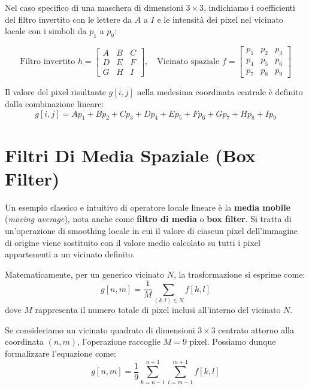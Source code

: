 ﻿\documentclass[11pt, a4paper]{article}
\begin{document}
Nel caso specifico di una maschera di dimensioni $3\times3$, indichiamo i coefficienti del filtro invertito con le lettere da $A$ a $I$ e le intensità dei pixel nel vicinato locale con i simboli da $p_1$ a $p_9$:

\[
\text{Filtro invertito } h = \begin{bmatrix} A & B & C \\ D & E & F \\ G & H & I \end{bmatrix}, \quad \text{Vicinato spaziale } f = \begin{bmatrix} p_1 & p_2 & p_3 \\ p_4 & p_5 & p_6 \\ p_7 & p_8 & p_9 \end{bmatrix}
\]

Il valore del pixel risultante $g[i, j]$ nella medesima coordinata centrale è definito dalla combinazione lineare:
\[ \boxed{g[i, j] = A p_1 + B p_2 + C p_3 + D p_4 + E p_5 + F p_6 + G p_7 + H p_8 + I p_9} \]


\newpage

\section{Filtri Di Media Spaziale (Box Filter)}

Un esempio classico e intuitivo di operatore locale lineare è la \textbf{media mobile} (\emph{moving average}), nota anche come \textbf{filtro di media} o \textbf{box filter}. Si tratta di un'operazione di smoothing locale in cui il valore di ciascun pixel dell'immagine di origine viene sostituito con il valore medio calcolato su tutti i pixel appartenenti a un vicinato definito.

Matematicamente, per un generico vicinato $N$, la trasformazione si esprime come:
\[ g[n, m] = \frac{1}{M} \sum_{(k, l) \in N} f[k, l] \]
dove $M$ rappresenta il numero totale di pixel inclusi all'interno del vicinato $N$.

Se consideriamo un vicinato quadrato di dimensioni $3\times3$ centrato attorno alla coordinata $(n, m)$, l'operazione raccoglie $M=9$ pixel. Possiamo dunque formalizzare l'equazione come:
\[ g[n, m] = \frac{1}{9} \sum_{k=n-1}^{n+1} \sum_{l=m-1}^{m+1} f[k, l] \]
\end{document}
